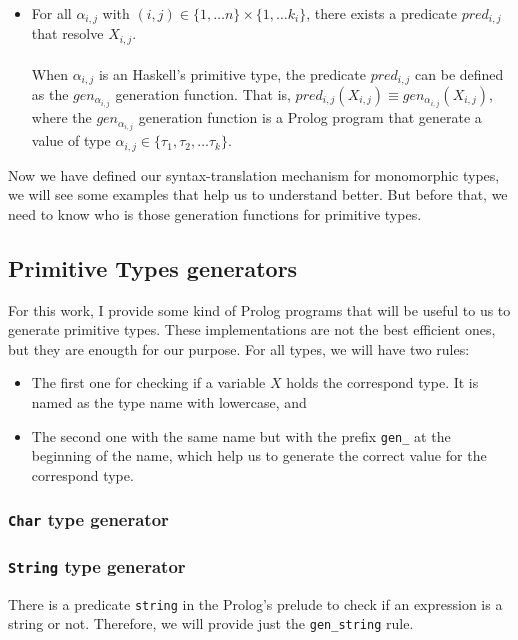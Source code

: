 \documentclass{report}
\theoremstyle{definition}
\theoremstyle{definition}
\newcommand{\ttt}[1]{\texttt{#1}}
\begin{document}
\begin{itemize}
	\item For all $\alpha_{i,j}$ with $(i,j) \in \{1, \ldots n \} \times \{1, \ldots k_i \}$, there exists a predicate $pred_{i,j}$ that resolve $X_{i,j}$.\\\\
	When $\alpha_{i,j}$ is an Haskell's primitive type, the predicate $pred_{i,j}$ can be defined as the $gen_{\alpha_{i,j}}$ generation function. That is, $pred_{i,j}(X_{i,j}) \equiv gen_{\alpha_{i,j}}(X_{i,j})$, where the $gen_{\alpha_{i,j}}$ generation function is a Prolog program that generate a value of type $\alpha_{i,j} \in \{ \tau_1 , \tau_2, \ldots \tau_k \}$.

\end{itemize}
Now we have defined our syntax-translation mechanism for monomorphic types, we will see some examples that help us to understand better. But before that, we need to know who is those generation functions for primitive types.
\subsection{Primitive Types generators}
For this work, I provide some kind of Prolog programs that will be useful to us to generate primitive types. These implementations are not the best efficient ones, but they are enougth for our purpose. For all types, we will have two rules:
\begin{itemize}
	\item The first one for checking if a variable $X$ holds the correspond type. It is named as the type name with lowercase, and
	\item The second one with the same name but with the prefix \ttt{gen\_} at the beginning of the name, which help us to generate the correct value for the correspond type.
\end{itemize}
\subsubsection{\ttt{Char} type generator}

\subsubsection{\ttt{String} type generator}
There is a predicate \ttt{string} in the Prolog's prelude to check if an expression is a string or not. Therefore, we will provide just the \ttt{gen\_string} rule.

\end{document}
